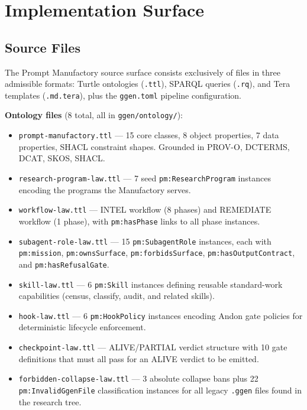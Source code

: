 
\section{Implementation Surface}
\label{sec:research-prompt-manufactory-implementation}

\subsection{Source Files}
\label{sec:research-prompt-manufactory-implementation-sources}

The Prompt Manufactory source surface consists exclusively of files in three admissible
formats: Turtle ontologies (\texttt{.ttl}), SPARQL queries (\texttt{.rq}), and Tera
templates (\texttt{.md.tera}), plus the \texttt{ggen.toml} pipeline configuration.

\textbf{Ontology files} (8 total, all in \texttt{ggen/ontology/}):
\begin{itemize}
  \item \texttt{prompt-manufactory.ttl} --- 15 core classes, 8 object properties,
    7 data properties, SHACL constraint shapes. Grounded in PROV-O, DCTERMS, DCAT,
    SKOS, SHACL.
  \item \texttt{research-program-law.ttl} --- 7 seed \texttt{pm:ResearchProgram}
    instances encoding the programs the Manufactory serves.
  \item \texttt{workflow-law.ttl} --- INTEL workflow (8 phases) and REMEDIATE workflow
    (1 phase), with \texttt{pm:hasPhase} links to all phase instances.
  \item \texttt{subagent-role-law.ttl} --- 15 \texttt{pm:SubagentRole} instances,
    each with \texttt{pm:mission}, \texttt{pm:ownsSurface}, \texttt{pm:forbidsSurface},
    \texttt{pm:hasOutputContract}, and \texttt{pm:hasRefusalGate}.
  \item \texttt{skill-law.ttl} --- 6 \texttt{pm:Skill} instances defining reusable
    standard-work capabilities (census, classify, audit, and related skills).
  \item \texttt{hook-law.ttl} --- 6 \texttt{pm:HookPolicy} instances encoding Andon
    gate policies for deterministic lifecycle enforcement.
  \item \texttt{checkpoint-law.ttl} --- ALIVE/PARTIAL verdict structure with 10 gate
    definitions that must all pass for an ALIVE verdict to be emitted.
  \item \texttt{forbidden-collapse-law.ttl} --- 3 absolute collapse bans plus 22
    \texttt{pm:InvalidGgenFile} classification instances for all legacy \texttt{.ggen}
    files found in the research tree.
\end{itemize}

